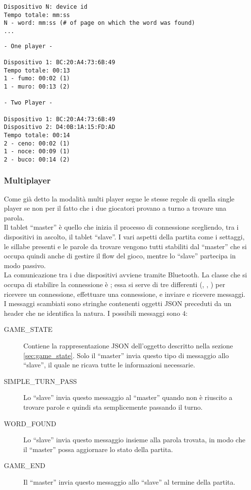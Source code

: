 \begin{lstlisting}[float, caption=Struttura delle satistiche inviate, label=lst:stats]
Dispositivo N: device id
Tempo totale: mm:ss
N - word: mm:ss (# of page on which the word was found)
...
\end{lstlisting}


\begin{lstlisting}[float, caption=Esempio di statistiche, label=lst:stats_example]
- One player -

Dispositivo 1: BC:20:A4:73:6B:49
Tempo totale: 00:13
1 - fumo: 00:02 (1)
1 - muro: 00:13 (2)

- Two Player -

Dispositivo 1: BC:20:A4:73:6B:49
Dispositivo 2: D4:0B:1A:15:FD:AD
Tempo totale: 00:14
2 - ceno: 00:02 (1)
1 - noce: 00:09 (1)
2 - buco: 00:14 (2)
\end{lstlisting}

\subsubsection{Multiplayer}
\label{sec:multiplayer}
Come già detto la modalità multi player segue le stesse regole di quella single player se non per il fatto che i due giocatori provano a turno a trovare una parola.\\
Il tablet ``master'' è quello che inizia il processo di connessione scegliendo, tra i dispositivi in ascolto, il tablet ``slave''. I vari aspetti della partita come i settaggi, le sillabe presenti e le parole da trovare vengono tutti stabiliti dal ``master'' che si occupa quindi anche di gestire il flow del gioco, mentre lo ``slave'' partecipa in modo passivo.\\
La comunicazione tra i due dispositivi avviene tramite Bluetooth. La classe che si occupa di stabilire la connessione è ; essa si serve di tre  differenti (, , ) per ricevere un connessione, effettuare una connessione, e inviare e ricevere messaggi.\\
I messaggi scambiati sono stringhe contenenti oggetti JSON preceduti da un header che ne identifica la natura. I possibili messaggi sono $4$:

\begin{description}
    \item[GAME\_STATE] Contiene la rappresentazione JSON dell'oggetto  descritto nella sezione \ref{sec:game_state}. Solo il ``master'' invia questo tipo di messaggio allo ``slave'', il quale ne ricava tutte le informazioni necessarie.
    \item[SIMPLE\_TURN\_PASS] Lo ``slave'' invia questo messaggio al ``master'' quando non è riuscito a trovare parole e quindi sta semplicemente passando il turno.
    \item[WORD\_FOUND] Lo ``slave'' invia questo messaggio insieme alla parola trovata, in modo che il ``master'' possa aggiornare lo stato della partita.
    \item[GAME\_END] Il ``master'' invia questo messaggio allo ``slave'' al termine della partita.
\end{description}
